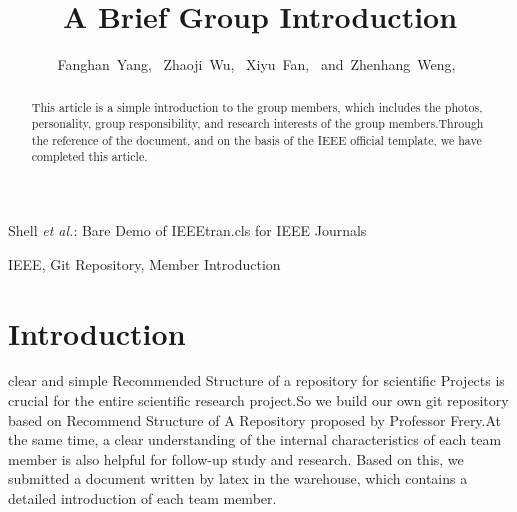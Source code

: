 \documentclass[journal]{IEEEtran}
\begin{document}
\title{A Brief Group Introduction}


\author{Fanghan~Yang,~
        Zhaoji~Wu,~
        Xiyu~Fan,~
        and~Zhenhang~Weng,~%
}


%
{Shell \MakeLowercase{\textit{et al.}}: Bare Demo of IEEEtran.cls for IEEE Journals}




\maketitle

\begin{abstract}
	This article is a simple introduction to the group members, which includes the photos, personality, group responsibility, and research interests of the group members.Through the reference of the document, and on the basis of the IEEE official template, we have completed this article.
\end{abstract}

\begin{IEEEkeywords}
IEEE, Git Repository, Member Introduction
\end{IEEEkeywords}




\IEEEpeerreviewmaketitle



\section{Introduction}

 clear and simple Recommended Structure of a repository for scientific Projects is crucial for the entire scientific research project.So we build our own git repository based on Recommend Structure of A Repository proposed by Professor Frery\cite{2020A}.At the same time, a clear understanding of the internal characteristics of each team member is also helpful for follow-up study and research. Based on this, we submitted a document written by latex in the warehouse, which contains a detailed introduction of each team member.
\end{document}
